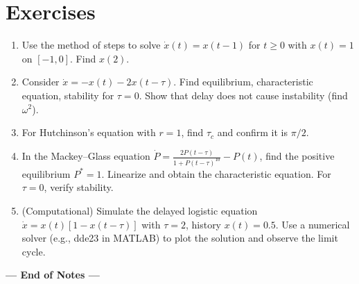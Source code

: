 \documentclass[12pt,a4paper]{book}
\begin{document}
\section{Exercises}
\begin{enumerate}[leftmargin=*, label=\textbf{Exercise 5.\arabic*}]
    \item Use the method of steps to solve $\dot{x}(t) = x(t-1)$ for $t\ge0$ with $x(t)=1$ on $[-1,0]$. Find $x(2)$.
    \item Consider $\dot{x} = -x(t) - 2 x(t-\tau)$. Find equilibrium, characteristic equation, stability for $\tau=0$. Show that delay does not cause instability (find $\omega^2$).
    \item For Hutchinson’s equation with $r=1$, find $\tau_c$ and confirm it is $\pi/2$.
    \item In the Mackey–Glass equation $\dot{P} = \frac{2 P(t-\tau)}{1 + P(t-\tau)^{10}} - P(t)$, find the positive equilibrium $P^*=1$. Linearize and obtain the characteristic equation. For $\tau=0$, verify stability.
    \item (Computational) Simulate the delayed logistic equation $\dot{x} = x(t)[1 - x(t-\tau)]$ with $\tau=2$, history $x(t)=0.5$. Use a numerical solver (e.g., dde23 in MATLAB) to plot the solution and observe the limit cycle.
\end{enumerate}

\vfill
\begin{center}
\textbf{--- End of Notes ---}
\end{center}
\end{document}
